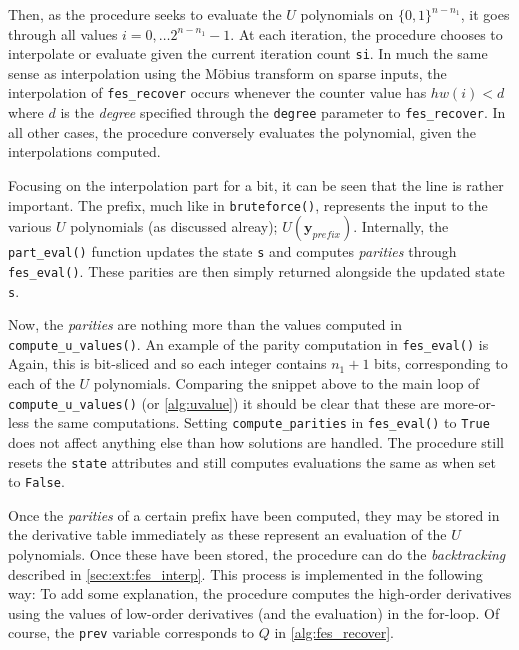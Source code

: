 Then, as the procedure seeks to evaluate the $U$ polynomials on $\{0,1\}^{n - n_1}$, it goes through all values $i = 0, \dots 2^{n - n_1} - 1$. At each iteration, the procedure chooses to interpolate or evaluate given the current iteration count \texttt{si}. In much the same sense as interpolation using the Möbius transform on sparse inputs, the interpolation of \texttt{fes\_recover} occurs whenever the counter value has $hw(i) < d$ where $d$ is the \textit{degree} specified through the \texttt{degree} parameter to \texttt{fes\_recover}. In all other cases, the procedure conversely evaluates the polynomial, given the interpolations computed.

Focusing on the interpolation part for a bit, it can be seen that the line
is rather important. The prefix, much like in \texttt{bruteforce()}, represents the input to the various $U$ polynomials (as discussed alreay); $U(\mathbf{y}_{prefix})$. Internally, the \texttt{part\_eval()} function updates the state \texttt{s} and computes \textit{parities} through \texttt{fes\_eval()}. These parities are then simply returned alongside the updated state \texttt{s}.

Now, the \textit{parities} are nothing more than the values computed in \texttt{compute\_u\_values()}. An example of the parity computation in \texttt{fes\_eval()} is 
Again, this is bit-sliced and so each integer contains $n_1 + 1$ bits, corresponding to each of the $U$ polynomials. Comparing the snippet above to the main loop of \texttt{compute\_u\_values()} (or \cref{alg:uvalue}) it should be clear that these are more-or-less the same computations. Setting \texttt{compute\_parities} in \texttt{fes\_eval()} to \texttt{True} does not affect anything else than how solutions are handled. The procedure still resets the \texttt{state} attributes and still computes evaluations the same as when set to \texttt{False}.

Once the \textit{parities} of a certain prefix have been computed, they may be stored in the derivative table immediately as these represent an evaluation of the $U$ polynomials. Once these have been stored, the procedure can do the \textit{backtracking} described in \cref{sec:ext:fes_interp}. This process is implemented in the following way:
To add some explanation, the procedure computes the high-order derivatives using the values of low-order derivatives (and the evaluation) in the for-loop. Of course, the \texttt{prev} variable corresponds to $Q$ in \cref{alg:fes_recover}.

